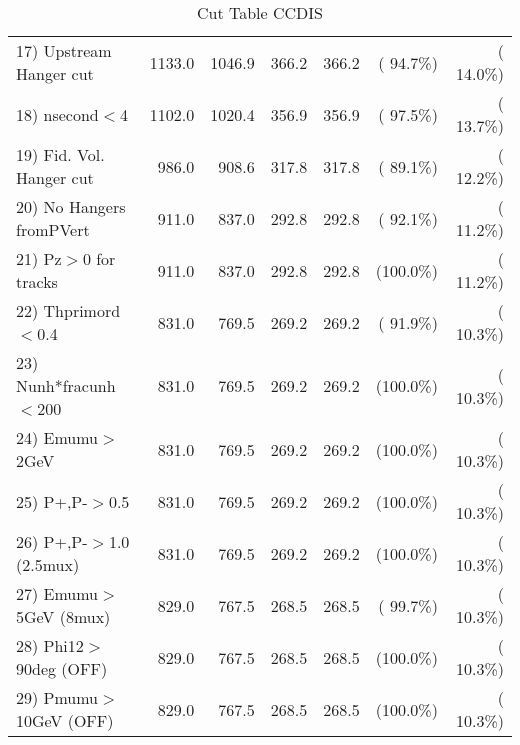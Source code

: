 \begin{table}[h!]
\begin{tabular}{||l||r|r|r|r|r|r||}
 17) Upstream Hanger cut  &       1133.0 &       1046.9 &        366.2 &        366.2 & ( 94.7\%) & ( 14.0\%) \\
 18) nsecond$<$4          &       1102.0 &       1020.4 &        356.9 &        356.9 & ( 97.5\%) & ( 13.7\%) \\
 19) Fid. Vol. Hanger cut &        986.0 &        908.6 &        317.8 &        317.8 & ( 89.1\%) & ( 12.2\%) \\
 20) No Hangers fromPVert &        911.0 &        837.0 &        292.8 &        292.8 & ( 92.1\%) & ( 11.2\%) \\
 21) Pz$>$0 for tracks    &        911.0 &        837.0 &        292.8 &        292.8 & (100.0\%) & ( 11.2\%) \\
 22) Thprimord$<$0.4      &        831.0 &        769.5 &        269.2 &        269.2 & ( 91.9\%) & ( 10.3\%) \\
 23) Nunh*fracunh$<$200   &        831.0 &        769.5 &        269.2 &        269.2 & (100.0\%) & ( 10.3\%) \\
 24) Emumu$>$2GeV         &        831.0 &        769.5 &        269.2 &        269.2 & (100.0\%) & ( 10.3\%) \\
 25) P+,P-$>$0.5          &        831.0 &        769.5 &        269.2 &        269.2 & (100.0\%) & ( 10.3\%) \\
 26) P+,P-$>$1.0 (2.5mux) &        831.0 &        769.5 &        269.2 &        269.2 & (100.0\%) & ( 10.3\%) \\
 27) Emumu$>$5GeV  (8mux) &        829.0 &        767.5 &        268.5 &        268.5 & ( 99.7\%) & ( 10.3\%) \\
 28) Phi12$>$90deg  (OFF) &        829.0 &        767.5 &        268.5 &        268.5 & (100.0\%) & ( 10.3\%) \\
 29) Pmumu$>$10GeV  (OFF) &        829.0 &        767.5 &        268.5 &        268.5 & (100.0\%) & ( 10.3\%) \\
 \hline
 \hline
 \end{tabular}
 \caption{Cut Table  CCDIS    }
 \label{tab-cutcohjpsi-mumu_ccdis}
 \end{table}
